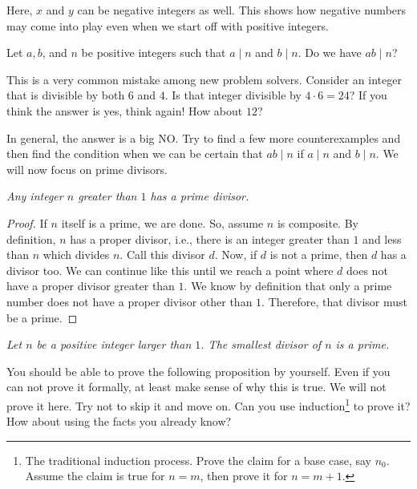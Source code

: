 \documentclass{subfile}
\begin{document}
	\begin{note}
		Here, $x$ and $y$ can be negative integers as well. This shows how negative numbers may come into play even when we start off with positive integers.
	\end{note}

	\begin{question}
		Let $a,b$, and $n$ be positive integers such that $a\mid n$ and $b\mid n$. Do we have $ab \mid n$?
	\end{question}
	This is a very common mistake among new problem solvers. Consider an integer that is divisible by both $6$ and $4$. Is that integer divisible by $4\cdot6=24$? If you think the answer is yes, think again! How about $12$?

	In general, the answer is a big NO. Try to find a few more counterexamples and then find the condition when we can be certain that $ab \mid n$ if $a\mid n$ and $b\mid n$. We will now focus on prime divisors.

	\begin{proposition}\slshape
		Any integer $n$ greater than $1$ has a prime divisor.
	\end{proposition}

	\begin{proof}
		If $n$ itself is a prime, we are done. So, assume $n$ is composite. By definition, $n$ has a proper divisor, i.e., there is an integer greater than $1$ and less than $n$ which divides $n$. Call this divisor $d$. Now, if $d$ is not a prime, then $d$ has a divisor too. We can continue like this until we reach a point where $d$ does not have a proper divisor greater than $1$. We know by definition that only a prime number does not have a proper divisor other than $1$. Therefore, that divisor must be a prime.
	\end{proof}

	\begin{corollary}\slshape\label{cor:smallestdivisor}
		Let $n$ be a positive integer larger than $1$. The smallest divisor of $n$ is a prime.
	\end{corollary}

	You should be able to prove the following proposition by yourself. Even if you can not prove it formally, at least make sense of why this is true. We will not prove it here. Try not to skip it and move on. Can you use induction\footnote{The traditional induction process. Prove the claim for a base case, say $n_0$. Assume the claim is true for $n=m$, then prove it for $n=m+1$.} to prove it? How about using the facts you already know?
\end{document}
